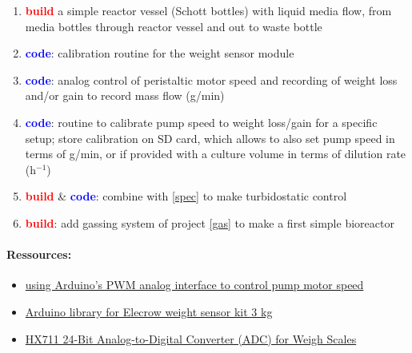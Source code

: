 \documentclass[12pt,a4paper]{scrartcl}
\newcommand{\build}[0]{\textcolor{red}{\textbf{build}}}
\newcommand{\code}[0]{\textcolor{blue}{\textbf{code}}}
\newcommand{\ph}[0]{h{\small$^{-1}$}}
\begin{document}
\begin{enumerate}
\item \build{} a simple reactor vessel (Schott bottles) with liquid
  media flow, from media bottles through reactor vessel and out to
  waste bottle 
\item \code{}: calibration routine for the weight sensor module
\item \code{}: analog control of peristaltic motor speed and recording of
  weight loss and/or gain to record mass flow (g/min)
\item \code{}: routine to calibrate pump speed to weight loss/gain
  for a specific setup; store calibration on SD card, which allows
  to also set pump speed in terms of g/min, or if provided with a culture
  volume in terms of dilution rate (\ph{})
\item \build{} \& \code{}: combine with \ref{spec} to make
  turbidostatic control
\item \build{}: add gassing system of project \ref{gas} to make a first
  simple bioreactor
\end{enumerate}

\paragraph{Ressources:}
\begin{itemize}
\item
  \href{http://www.instructables.com/id/Control-peristaltic-pump-with-TA7291P-and-an-Ardui/}{using
    Arduino's PWM analog interface to control pump motor speed}
\item \href{http://www.elecrow.com/wiki/index.php?title=Weight_Sensor_Scales_Kit-_20KG}{Arduino library for Elecrow weight sensor kit 3 kg}
\item \href{https://cdn.sparkfun.com/datasheets/Sensors/ForceFlex/hx711_english.pdf}{HX711 24-Bit Analog-to-Digital Converter (ADC) for Weigh Scales}
\end{itemize}
\end{document}
